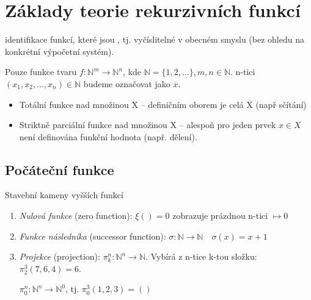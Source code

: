 \documentclass[a4paper, 11pt]{report}
\begin{document}
\section{Základy teorie rekurzivních funkcí}

identifikace funkcí, které jsou , tj. vyčíslitelné v obecném smyslu (bez ohledu na konkrétní výpočetní systém).

Pouze funkce tvaru $f: \mathbb{N}^m \to \mathbb{N}^n$, kde $\mathbb{N} = \{1, 2, \dots\}, m,n \in \mathbb{N}$. n-tici $(x_1, x_2, \dots, x_n) \in \mathbb{N}$ budeme označovat jako $\overline{x}$.
\begin{itemize}
	\item Totální funkce nad množinou X -- definičním oborem je celá X (např sčítání)
	\item Striktně parciální funkce nad množinou X -- alespoň pro jeden prvek $x \in X$ není definována funkční hodnota (např. dělení).
\end{itemize}

\subsection{Počáteční funkce}
Stavební kameny vyšších funkcí
\begin{enumerate}
	\item \emph{Nulová funkce} (zero function): $\xi() = 0$ zobrazuje prázdnou n-tici $\mapsto 0$
	\item \emph{Funkce následníka} (successor function): $\sigma: \mathbb{N} \to \mathbb{N} \quad \sigma(x) = x + 1$
	\item \emph{Projekce} (projection): $\pi_k^n: \mathbb{N}^n \to \mathbb{N}$. Vybírá z n-tice k-tou složku: $\pi_2^3(7,6,4) = 6$.
	
	$\pi_0^n: \mathbb{N}^n \to \mathbb{N}^0$, tj. $\pi_0^3(1,2, 3) = ()$
\end{enumerate}
\end{document}
